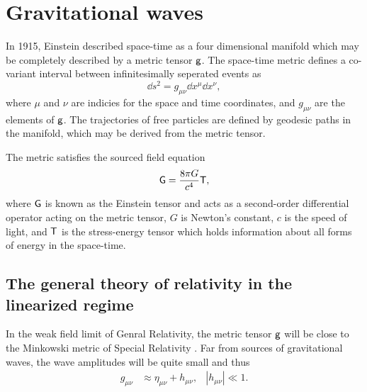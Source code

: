 \chapter{Gravitational waves}

In 1915, Einstein described space-time as a four dimensional manifold which may be completely described by a metric tensor $\mathsf{g}$. %
The space-time metric defines a co-variant interval between infinitesimally seperated events as
\begin{equation}
\dd s^2 = g_{\mu \nu}\dd x^\mu \dd x^\nu,
\end{equation}
where $\mu$ and $\nu$ are indicies for the space and time coordinates, and $g_{\mu \nu}$ are the elements of $\mathsf{g}$. %
The trajectories of free particles are defined by geodesic paths in the manifold, which may be derived from the metric tensor\cite[Chap. %
3]{carroll2004spacetime}.

The metric satisfies the sourced field equation
\begin{equation}
\label{eqn:einstein}
\mathsf{G}=\frac{8\pi G}{c^4}\mathsf{T},
\end{equation}
where $\mathsf{G}$ is known as the Einstein tensor and acts as a second-order differential operator acting on the metric tensor, $G$ is Newton's constant, $c$ is the speed of light, and $\mathsf{T}$ is the stress-energy tensor which holds information about all forms of energy in the space-time.

\section{The general theory of relativity in the linearized regime}
In the weak field limit of Genral Relativity, the metric tensor $\mathsf{g}$ will be close to the Minkowski metric of Special Relativity \cite[Chap. %
7]{carroll2004spacetime}. %
Far from sources of gravitational waves, the wave amplitudes will be quite small and thus
\begin{align}
g_{\mu \nu}&\approx \eta_{\mu \nu}+h_{\mu \nu}, &|h_{\mu \nu}|\ll 1.
\end{align}


